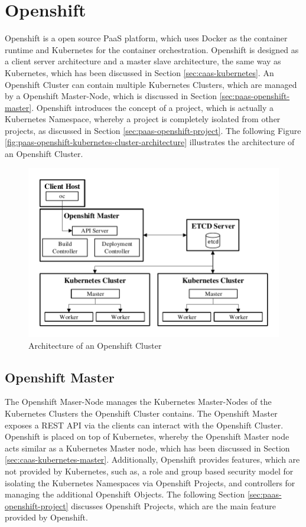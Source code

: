 \section{Openshift}
\label{sec:paas-openshift}
Openshift is a open source PaaS platform, which uses Docker as the container runtime and Kubernetes for the container orchestration. Openshift is designed as a client server architecture and a master slave architecture, the same way as Kubernetes, which has been discussed in Section \vref{sec:caas-kubernetes}. An Openshift Cluster can contain multiple Kubernetes Clusters, which are managed by a Openshift Master-Node, which is discussed in Section \vref{sec:paas-openshift-master}. Openshift introduces the concept of a project,  which is actually a Kubernetes Namespace, whereby a project is completely isolated from other projects, as discussed in Section \vref{sec:paas-openshift-project}. The following Figure \vref{fig:paas-openshift-kubernetes-cluster-architecture} illustrates the architecture of an Openshift Cluster\cite{OpenshiftDeepDive2014, OpenshiftCoreConcepts2018}.

\begin{figure}[htbp]
	\centering
	\includegraphics[scale=1]{images/openshift-kubernetes-cluster-architecture.pdf}
	\caption{Architecture of an Openshift Cluster}
	\label{fig:paas-openshift-kubernetes-cluster-architecture}
\end{figure} 

\subsection{Openshift Master}
\label{sec:paas-openshift-master}
The Openshift Maser-Node manages the Kubernetes Master-Nodes of the Kubernetes Clusters the Openshift Cluster contains. The Openshift Master exposes a REST API via the clients can interact with the Openshift Cluster. Openshift is placed on top of Kubernetes, whereby the Openshift Master node acts similar as a Kubernetes Master node, which has been discussed in Section \vref{sec:caas-kubernetes-master}. Additionally, Openshift provides features, which are not provided by Kubernetes, such as, a role and group based security model for isolating the Kubernetes Namespaces via Openshift Projects, and controllers for managing the additional Openshift Objects. The following Section \vref{sec:paas-openshift-project} discusses Openshift Projects, which are the main feature provided by Openshift.

